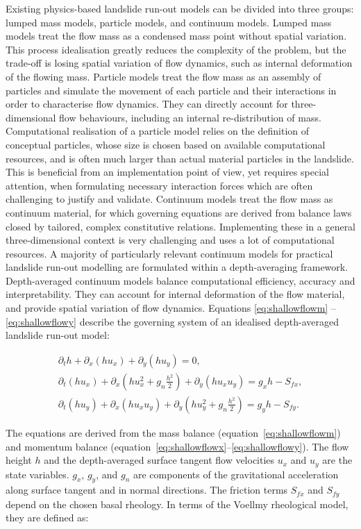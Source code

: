 \documentclass[utf8]{FrontiersinHarvard}
\begin{document}
Existing physics-based landslide run-out models can be divided into three groups: lumped mass models, particle models, and continuum models. Lumped mass models treat the flow mass as a condensed mass point without spatial variation. This process idealisation greatly reduces the complexity of the problem, but the trade-off is losing spatial variation of flow dynamics, such as internal deformation of the flowing mass. Particle models treat the flow mass as an assembly of particles and simulate the movement of each particle and their interactions in order to characterise flow dynamics. They can directly account for three-dimensional flow behaviours, including an internal re-distribution of mass. Computational realisation of a particle model relies on the definition of conceptual particles, whose size is chosen based on available computational resources, and is often much larger than actual material particles in the landslide. This is beneficial from an implementation point of view, yet requires special attention, when formulating necessary interaction forces which are often challenging to justify and validate. Continuum models treat the flow mass as continuum material, for which governing equations are derived from balance laws closed by tailored, complex constitutive relations. Implementing these in a general three-dimensional context is very challenging and uses a lot of computational resources. A majority of particularly relevant continuum models for practical landslide run-out modelling are formulated within a depth-averaging framework. Depth-averaged continuum models balance computational efficiency, accuracy and interpretability. They can account for internal deformation of the flow material, and provide spatial variation of flow dynamics. Equations \ref{eq:shallowflowm} -- \ref{eq:shallowflowy} describe the governing system of an idealised depth-averaged landslide run-out model:
\begin{linenomath}
\begin{gather} 
\partial_th + \partial_x(hu_x) + \partial_y(hu_y) = 0, \label{eq:shallowflowm} \\
\partial_t(hu_x) + \partial_x \left( hu^{2}_x + g_n  \frac{h^2}{2} \right) + \partial_y \left( hu_x u_y \right) = g_x h - S_{fx}, \label{eq:shallowflowx}\\
\partial_t(hu_y) + \partial_x (hu_xu_y) + \partial_y \left( hu^{2}_y + g_n \frac{h^2}{2} \right) = g_yh - S_{fy}. \label{eq:shallowflowy}
\end{gather}
\end{linenomath}
The equations are derived from the mass balance (equation~\ref{eq:shallowflowm}) and momentum balance (equation~\ref{eq:shallowflowx}--\ref{eq:shallowflowy}). The flow height $h$ and the depth-averaged surface tangent flow velocities $u_{x}$ and $u_{y}$ are the state variables. $g_x$, $g_y$, and $g_n$ are components of the gravitational acceleration along surface tangent and in normal directions. The friction terms $S_{fx}$ and $S_{fy}$ depend on the chosen basal rheology. In terms of the Voellmy rheological model, they are defined as:
\end{document}

